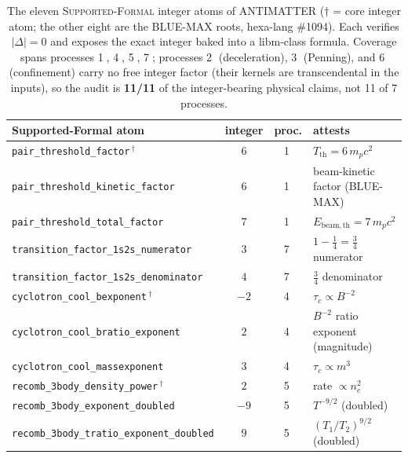 \begin{table}[h]
\centering
\small
\setlength{\tabcolsep}{5pt}
\begin{tabular}{@{}l c c l@{}}
\toprule
\textbf{Supported-Formal atom} & \textbf{integer} & \textbf{proc.} & \textbf{attests} \\
\midrule
\verb|pair_threshold_factor|\,$^\dagger$        & $6$  & \textcircled{\scriptsize 1} & $T_{\mathrm{th}}=6\,m_pc^2$ \\
\verb|pair_threshold_kinetic_factor|            & $6$  & \textcircled{\scriptsize 1} & beam-kinetic factor (BLUE-MAX) \\
\verb|pair_threshold_total_factor|              & $7$  & \textcircled{\scriptsize 1} & $E_{\mathrm{beam,th}}=7\,m_pc^2$ \\
\verb|transition_factor_1s2s_numerator|         & $3$  & \textcircled{\scriptsize 7} & $1-\tfrac14=\tfrac34$ numerator \\
\verb|transition_factor_1s2s_denominator|       & $4$  & \textcircled{\scriptsize 7} & $\tfrac34$ denominator \\
\verb|cyclotron_cool_bexponent|\,$^\dagger$     & $-2$ & \textcircled{\scriptsize 4} & $\tau_c\propto B^{-2}$ \\
\verb|cyclotron_cool_bratio_exponent|           & $2$  & \textcircled{\scriptsize 4} & $B^{-2}$ ratio exponent (magnitude) \\
\verb|cyclotron_cool_massexponent|              & $3$  & \textcircled{\scriptsize 4} & $\tau_c\propto m^3$ \\
\verb|recomb_3body_density_power|\,$^\dagger$    & $2$  & \textcircled{\scriptsize 5} & rate $\propto n_e^2$ \\
\verb|recomb_3body_exponent_doubled|            & $-9$ & \textcircled{\scriptsize 5} & $T^{-9/2}$ (doubled) \\
\verb|recomb_3body_tratio_exponent_doubled|     & $9$  & \textcircled{\scriptsize 5} & $(T_1/T_2)^{9/2}$ (doubled) \\
\bottomrule
\end{tabular}
\caption{The eleven \textsc{Supported-Formal} integer atoms of ANTIMATTER
($\dagger$ = core integer atom; the other eight are the BLUE-MAX roots,
hexa-lang \#1094). Each verifies $|\Delta|=0$ and exposes the exact integer
baked into a libm-class formula. Coverage spans processes
\textcircled{\scriptsize 1}, \textcircled{\scriptsize 4},
\textcircled{\scriptsize 5}, \textcircled{\scriptsize 7}; processes
\textcircled{\scriptsize 2} (deceleration), \textcircled{\scriptsize 3}
(Penning), and \textcircled{\scriptsize 6} (confinement) carry no free integer
factor (their kernels are transcendental in the inputs), so the audit is
\textbf{11/11} of the integer-bearing physical claims, not 11 of 7 processes.}
\label{tab:bm-atoms}
\end{table}

